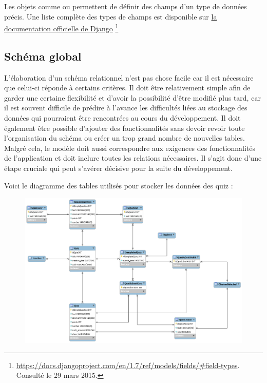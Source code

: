 \documentclass[a4,10pt,french]{sphinxmanual}
\begin{document}
Les objets comme  ou  permettent de définir des champs d'un type de données précis. Une liste complète des types de champs est disponible sur \href{https://docs.djangoproject.com/en/1.7/ref/models/fields/\#field-types}{la documentation officielle de Django} \footnote{
\href{https://docs.djangoproject.com/en/1.7/ref/models/fields/\#field-types}{https://docs.djangoproject.com/en/1.7/ref/models/fields/\#field-types}. Consulté le 29 mars 2015.
}


\subsection{Schéma global}
\label{database:schema-global}
L'élaboration d'un schéma relationnel n'est pas chose facile car il est nécessaire que celui-ci réponde à certains critères. Il doit être relativement simple afin de garder une certaine flexibilité et d'avoir la possibilité d'être modifié plus tard, car il est souvent difficile de prédire à l'avance les difficultés liées au stockage des données qui pourraient être rencontrées au cours du développement. Il doit également être possible d'ajouter des fonctionnalités sans devoir revoir toute l'organisation du schéma ou créer un trop grand nombre de nouvelles tables. Malgré cela, le modèle doit aussi correspondre aux exigences des fonctionnalités de l'application et doit inclure toutes les relations nécessaires. Il s'agit donc d'une étape cruciale qui peut s'avérer décisive pour la suite du développement.

Voici le diagramme des tables utilisés pour stocker les données des quiz :
\begin{figure}[htbp]
\centering

\includegraphics{quiz-models.png}
\end{figure}
\end{document}
